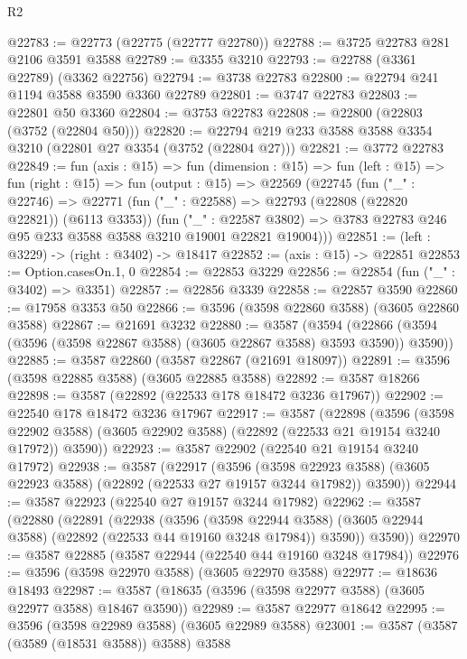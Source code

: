 \begin{lexlean}{R2}
\begin{coremodule}
@22783 := @22773 (@22775 (@22777 @22780))
@22788 := @3725 @22783 @281 @2106 @3591 @3588
@22789 := @3355 @3210
@22793 := @22788 (@3361 @22789) (@3362 @22756)
@22794 := @3738 @22783
@22800 := @22794 @241 @1194 @3588 @3590 @3360 @22789
@22801 := @3747 @22783
@22803 := @22801 @50 @3360
@22804 := @3753 @22783
@22808 := @22800 (@22803 (@3752 (@22804 @50)))
@22820 := @22794 @219 @233 @3588 @3588 @3354 @3210 (@22801 @27 @3354 (@3752 (@22804 @27)))
@22821 := @3772 @22783
@22849 := fun (axis : @15) =>
  fun (dimension : @15) =>
  fun (left : @15) =>
  fun (right : @15) =>
  fun (output : @15) =>
  @22569
    (@22745
      (fun ("_" : @22746) =>
      @22771
        (fun ("_" : @22588) => @22793 (@22808 (@22820 @22821)) (@6113 @3353))
        (fun ("_" : @22587 @3802) =>
        @3783 @22783 @246 @95 @233 @3588 @3588 @3210 @19001 @22821 @19004)))
@22851 := (left : @3229) -> (right : @3402) -> @18417
@22852 := (axis : @15) -> @22851
@22853 := Option.casesOn.{1, 0}
@22854 := @22853 @3229
@22856 := @22854 (fun ("_" : @3402) => @3351)
@22857 := @22856 @3339
@22858 := @22857 @3590
@22860 := @17958 @3353 @50
@22866 := @3596 (@3598 @22860 @3588) (@3605 @22860 @3588)
@22867 := @21691 @3232
@22880 := @3587
    (@3594 (@22866 (@3594 (@3596 (@3598 @22867 @3588) (@3605 @22867 @3588) @3593 @3590)) @3590))
@22885 := @3587 @22860 (@3587 @22867 (@21691 @18097))
@22891 := @3596 (@3598 @22885 @3588) (@3605 @22885 @3588)
@22892 := @3587 @18266
@22898 := @3587 (@22892 (@22533 @178 @18472 @3236 @17967))
@22902 := @22540 @178 @18472 @3236 @17967
@22917 := @3587
    (@22898
      (@3596
        (@3598 @22902 @3588)
        (@3605 @22902 @3588)
        (@22892 (@22533 @21 @19154 @3240 @17972))
        @3590))
@22923 := @3587 @22902 (@22540 @21 @19154 @3240 @17972)
@22938 := @3587
    (@22917
      (@3596
        (@3598 @22923 @3588)
        (@3605 @22923 @3588)
        (@22892 (@22533 @27 @19157 @3244 @17982))
        @3590))
@22944 := @3587 @22923 (@22540 @27 @19157 @3244 @17982)
@22962 := @3587
    (@22880
      (@22891
        (@22938
          (@3596
            (@3598 @22944 @3588)
            (@3605 @22944 @3588)
            (@22892 (@22533 @44 @19160 @3248 @17984))
            @3590))
        @3590))
@22970 := @3587 @22885 (@3587 @22944 (@22540 @44 @19160 @3248 @17984))
@22976 := @3596 (@3598 @22970 @3588) (@3605 @22970 @3588)
@22977 := @18636 @18493
@22987 := @3587 (@18635 (@3596 (@3598 @22977 @3588) (@3605 @22977 @3588) @18467 @3590))
@22989 := @3587 @22977 @18642
@22995 := @3596 (@3598 @22989 @3588) (@3605 @22989 @3588)
@23001 := @3587 (@3587 (@3589 (@18531 @3588)) @3588) @3588

\end{coremodule}
\end{lexlean}
